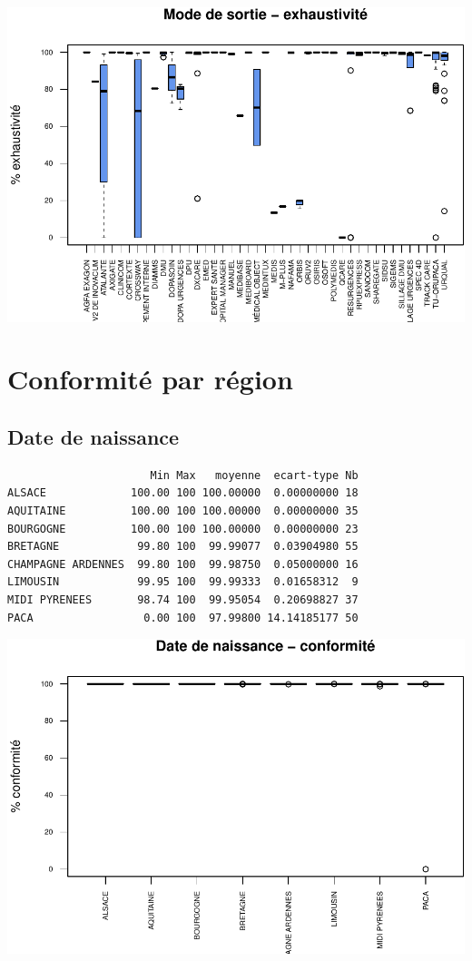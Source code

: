\documentclass[]{article}
\begin{document}
\includegraphics{septembre2015_files/figure-latex/unnamed-chunk-25-1.pdf}

\section{Conformité par région}\label{conformite-par-region}

\subsection{Date de naissance}\label{date-de-naissance-1}

\begin{verbatim}
                      Min Max   moyenne  ecart-type Nb
ALSACE             100.00 100 100.00000  0.00000000 18
AQUITAINE          100.00 100 100.00000  0.00000000 35
BOURGOGNE          100.00 100 100.00000  0.00000000 23
BRETAGNE            99.80 100  99.99077  0.03904980 55
CHAMPAGNE ARDENNES  99.80 100  99.98750  0.05000000 16
LIMOUSIN            99.95 100  99.99333  0.01658312  9
MIDI PYRENEES       98.74 100  99.95054  0.20698827 37
PACA                 0.00 100  97.99800 14.14185177 50
\end{verbatim}

\includegraphics{septembre2015_files/figure-latex/unnamed-chunk-26-1.pdf}
\end{document}
